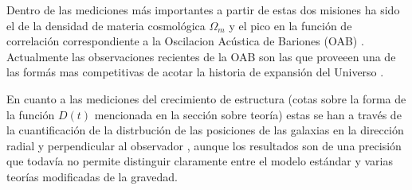 Dentro de las mediciones m\'as importantes a partir de estas dos misiones
ha sido el de la densidad de materia cosmol\'ogica $\Omega_m$
\cite{2001Natur.410..169P} y el pico en la funci\'on de
correlaci\'on correspondiente a la Oscilacion Ac\'ustica de Bariones
(OAB) \cite{Eisenstein2005}. Actualmente las observaciones recientes de la OAB
son las que proveeen una de las form\'as mas competitivas de acotar la
historia de expansi\'on del Universo \cite{2014MNRAS.441...24A}.

En cuanto a las mediciones del crecimiento de estructura (cotas sobre
la forma de la funci\'on $D(t)$ mencionada en la secci\'on sobre
teor\'ia) estas se han a trav\'es de la cuantificaci\'on de la
distrbuci\'on de las posiciones de las galaxias en la direcci\'on
radial y perpendicular al observador \cite{2014MNRAS.439.3504S},
aunque los resultados son de una precisi\'on que todav\'ia no permite
distinguir claramente entre el modelo est\'andar y varias teor\'ias
modificadas de la gravedad.
